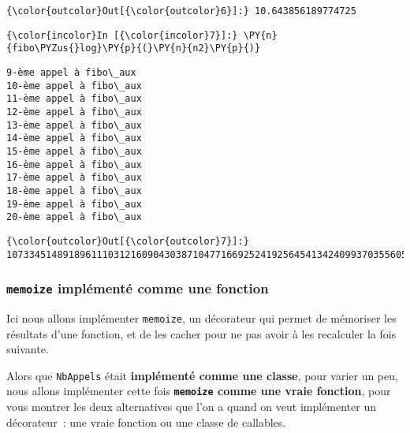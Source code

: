\begin{Verbatim}[commandchars=\\\{\}]
{\color{outcolor}Out[{\color{outcolor}6}]:} 10.643856189774725
\end{Verbatim}
            
    \begin{Verbatim}[commandchars=\\\{\}]
{\color{incolor}In [{\color{incolor}7}]:} \PY{n}{fibo\PYZus{}log}\PY{p}{(}\PY{n}{n2}\PY{p}{)}
\end{Verbatim}


    \begin{Verbatim}[commandchars=\\\{\}]
9-ème appel à fibo\_aux
10-ème appel à fibo\_aux
11-ème appel à fibo\_aux
12-ème appel à fibo\_aux
13-ème appel à fibo\_aux
14-ème appel à fibo\_aux
15-ème appel à fibo\_aux
16-ème appel à fibo\_aux
17-ème appel à fibo\_aux
18-ème appel à fibo\_aux
19-ème appel à fibo\_aux
20-ème appel à fibo\_aux

    \end{Verbatim}

\begin{Verbatim}[commandchars=\\\{\}]
{\color{outcolor}Out[{\color{outcolor}7}]:} 10733451489189611103121609043038710477166925241925645413424099370355605456852169736033991876014762808340865848447476173426115162172818890323837138136782951865054538417494035229785971002587932638902311416018904156170269354720460896363558168129004231138415225204738582550720791061581463934092726107458349298577292984375276210232582438075
\end{Verbatim}
            
    \hypertarget{memoize-impluxe9mentuxe9-comme-une-fonction}{%
\subsubsection{\texorpdfstring{\texttt{memoize} implémenté comme une
fonction}{memoize implémenté comme une fonction}}\label{memoize-impluxe9mentuxe9-comme-une-fonction}}

    Ici nous allons implémenter \texttt{memoize}, un décorateur qui permet
de mémoriser les résultats d'une fonction, et de les cacher pour ne pas
avoir à les recalculer la fois suivante.

Alors que \texttt{NbAppels} était \textbf{implémenté comme une classe},
pour varier un peu, nous allons implémenter cette fois
\textbf{\texttt{memoize} comme une vraie fonction}, pour vous montrer
les deux alternatives que l'on a quand on veut implémenter un
décorateur~: une vraie fonction ou une classe de callables.

